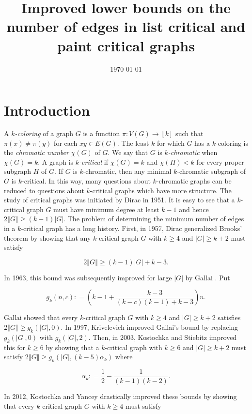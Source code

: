 \documentclass[12pt]{article}
\title{Improved lower bounds on the number of edges in list critical and paint critical graphs}
\date{\today}
\theoremstyle{plain}
\theoremstyle{definition}
\theoremstyle{remark}
\newcommand{\card}[1]{\left|#1\right|}
\newcommand{\size}[1]{\left\Vert#1\right\Vert}
\newcommand{\func}[3]{#1\colon #2 \rightarrow #3}
\newcommand{\irange}[1]{\left[#1\right]}
\newcommand{\parens}[1]{\left( #1 \right)}
\newcommand{\DefinedAs}{\mathrel{\mathop:}=}
\begin{document}
\maketitle

\section{Introduction}
A \emph{$k$-coloring} of a graph $G$ is a function $\func{\pi}{V(G)}{\irange{k}}$ such that $\pi(x) \neq \pi(y)$ for each $xy \in E(G)$.  The least $k$ for which $G$ has a $k$-coloring is the \emph{chromatic number} $\chi(G)$ of $G$. We say that $G$ is \emph{$k$-chromatic} when $\chi(G) = k$.  A graph is \emph{$k$-critical} if $\chi(G) = k$ and $\chi(H) < k$ for every proper subgraph $H$ of $G$.  If $G$ is $k$-chromatic, then any minimal $k$-chromatic subgraph of $G$ is $k$-critical.  In this way, many questions about $k$-chromatic graphs can be reduced to questions about $k$-critical graphs which have more structure.  The study of critical graphs was initiated by Dirac \cite{dirac1951note} in 1951.  It is easy to see that a $k$-critical graph $G$ must have minimum degree at least $k-1$ and hence $2\size{G} \geq (k-1)\card{G}$.  The problem of determining the minimum number of edges in a $k$-critical graph has a long history. First, in 1957, Dirac \cite{dirac1957theorem} generalized Brooks' theorem \cite{brooks1941colouring} by showing that any $k$-critical graph $G$ with $k \geq 4$ and $\card{G} \geq k+2$ must satisfy 

\[2\size{G} \geq (k-1)\card{G} + k-3.\]

In 1963, this bound was subsequently improved for large $\card{G}$ by Gallai \cite{gallai1963kritische}.  Put 

\[g_k(n, c) \DefinedAs \parens{k-1 + \frac{k-3}{(k-c)(k-1) + k-3}}n.\]

Gallai showed that every $k$-critical graph $G$ with $k \geq 4$ and $\card{G} \geq k+2$ satisfies $2\size{G} \geq g_k(\card{G}, 0)$.  In 1997, Krivelevich \cite{krivelevich1997minimal} improved Gallai's bound by replacing $g_k(\card{G}, 0)$ with $g_k(\card{G}, 2)$.  Then, in 2003, Kostochka and Stiebitz \cite{kostochkastiebitzedgesincriticalgraph} improved this for $k \geq 6$ by showing that a $k$-critical graph with $k \geq 6$ and $\card{G} \geq k+2$ must satisfy $2\size{G} \geq g_k(\card{G}, (k-5)\alpha_k)$ where

\[\alpha_k \DefinedAs \frac12 - \frac{1}{(k-1)(k-2)}.\]

In 2012, Kostochka and Yancey \cite{kostochkayancey2012ore} drastically improved these bounds by showing that every $k$-critical graph $G$ with $k \geq 4$ must satisfy
\end{document}
